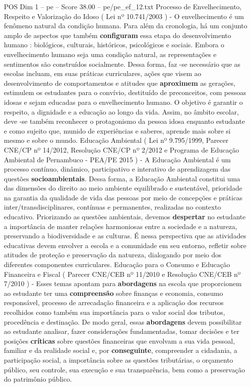 \begin{textsample}{POS Dim 1 – pe – Score 38.00 – pe/pe\_ef\_12.txt}
Processo de Envelhecimento, Respeito e Valorização do Idoso ( Lei nº 10.741/2003 ) - O envelhecimento é um fenômeno natural da condição humana.
Para além da cronologia, há um conjunto amplo de aspectos que também \textbf{configuram} essa etapa do desenvolvimento humano : biológicos, culturais, históricos, psicológicos e sociais.
Embora o envelhecimento humano seja uma condição natural, as representações e sentimentos são construídos socialmente.
Dessa forma, faz -se necessário que as escolas incluam, em suas práticas curriculares, ações que visem ao desenvolvimento de comportamentos e atitudes que \textbf{aproximem} as gerações, estimulem os estudantes para o convívio, destituído de preconceitos, com pessoas idosas e sejam educadas para o envelhecimento humano.
O objetivo é garantir o respeito, a dignidade e a educação ao longo da vida.
Assim, no âmbito escolar, deve -se também reconhecer o protagonismo da pessoa idosa enquanto estudante e como sujeito que, munido de experiências e saberes, aprende mais sobre si mesmo e sobre o mundo.
Educação Ambiental ( Lei nº 9.795/1999, Parecer CNE/CP nº 14/2012, Resolução CNE/CP nº 2/2012 e Programa de Educação Ambiental de Pernambuco - PEA/PE 2015 ) - A Educação Ambiental é um processo contínuo, dinâmico, participativo e interativo de aprendizagem das questões \textbf{socioambientais}.
Dessa forma, a Educação Ambiental constitui uma das dimensões do direito ao meio ambiente equilibrado e sustentável, prioridade na garantia da qualidade de vida das pessoas por meio de concepções e práticas inter/transdisciplinares, contínuas e permanentes, realizadas no contexto educativo.
Priorizando as questões ambientais, devemos \textbf{despertar} no estudante a importância de manter relações harmoniosas entre a sociedade e a natureza, preservando a biodiversidade e as culturas.
É nessa perspectiva que as atividades educativas devem envolver a escola e a comunidade em seu entorno, refletir sobre atitudes de proteção e preservação da natureza, dialogando por meio dos diferentes componentes curriculares.
Educação para o Consumo e Educação Financeira e Fiscal ( Parecer CNE/CEB nº 11/2010 e Resolução CNE/CEB nº 7/2010 ) - Esses temas apontam para \textbf{abordagens} na escola que proporcionem ao estudante ter uma \textbf{compreensão} sobre finanças e economia, consumo responsável, processo de arrecadação financeira e a aplicação dos recursos recolhidos como também sua importância para o valor social dos tributos, procedência e destinação.
De modo geral, essas \textbf{abordagens} devem possibilitar ao estudante analisar, fazer considerações fundamentadas, tomar decisões e ter posições \textbf{críticas} sobre questões financeiras que envolvam a sua vida pessoal, familiar e da realidade social e, por \textbf{conseguinte}, compreender a cidadania, a participação social, a importância sobre as questões tributárias, o orçamento público, seu controle, sua execução e sua transparência, bem como a preservação do patrimônio público.

\end{textsample}
